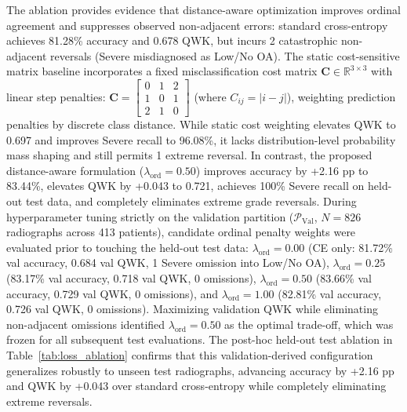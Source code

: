 \documentclass[10pt,journal]{IEEEtran}
\begin{document}
The ablation provides evidence that distance-aware optimization improves ordinal agreement and suppresses observed non-adjacent errors: standard cross-entropy achieves 81.28\% accuracy and 0.678 QWK, but incurs 2 catastrophic non-adjacent reversals (Severe misdiagnosed as Low/No OA). The static cost-sensitive matrix baseline incorporates a fixed misclassification cost matrix $\mathbf{C} \in \mathbb{R}^{3 \times 3}$ with linear step penalties: $\mathbf{C} = \begin{bmatrix} 0 & 1 & 2 \\ 1 & 0 & 1 \\ 2 & 1 & 0 \end{bmatrix}$ (where $C_{ij} = |i - j|$), weighting prediction penalties by discrete class distance. While static cost weighting elevates QWK to 0.697 and improves Severe recall to 96.08\%, it lacks distribution-level probability mass shaping and still permits 1 extreme reversal. In contrast, the proposed distance-aware formulation ($\lambda_{\text{ord}} = 0.50$) improves accuracy by +2.16 pp to 83.44\%, elevates QWK by +0.043 to 0.721, achieves 100\% Severe recall on held-out test data, and completely eliminates extreme grade reversals. During hyperparameter tuning strictly on the validation partition ($\mathcal{P}_{\text{Val}}$, $N = 826$ radiographs across 413 patients), candidate ordinal penalty weights were evaluated prior to touching the held-out test data: $\lambda_{\text{ord}} = 0.00$ (CE only: 81.72\% val accuracy, 0.684 val QWK, 1 Severe omission into Low/No OA), $\lambda_{\text{ord}} = 0.25$ (83.17\% val accuracy, 0.718 val QWK, 0 omissions), $\lambda_{\text{ord}} = 0.50$ (83.66\% val accuracy, 0.729 val QWK, 0 omissions), and $\lambda_{\text{ord}} = 1.00$ (82.81\% val accuracy, 0.726 val QWK, 0 omissions). Maximizing validation QWK while eliminating non-adjacent omissions identified $\lambda_{\text{ord}} = 0.50$ as the optimal trade-off, which was frozen for all subsequent test evaluations. The post-hoc held-out test ablation in Table~\ref{tab:loss_ablation} confirms that this validation-derived configuration generalizes robustly to unseen test radiographs, advancing accuracy by +2.16 pp and QWK by +0.043 over standard cross-entropy while completely eliminating extreme reversals.
\end{document}
